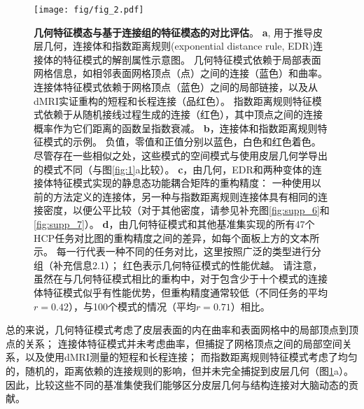 \documentclass[lang=cn,a4paper,newtx]{elegantpaper}
\begin{document}
\begin{figure}[!htb]
	\centering
	\texttt{[image: fig/fig\_2.pdf]}
	\caption{\textbf{几何特征模态与基于连接组的特征模态的对比评估}。
		\textbf{a}, 用于推导皮层几何，连接体和指数距离规则(exponential distance rule, EDR)连接体的特征模式的解剖属性示意图。
		几何特征模式依赖于局部表面网格信息，如相邻表面网格顶点（点）之间的连接（蓝色）和曲率。
		连接体特征模式依赖于网格顶点（蓝色）之间的局部链接，以及从dMRI实证重构的短程和长程连接（品红色）。
		指数距离规则特征模式依赖于从随机接线过程生成的连接（红色），其中顶点之间的连接概率作为它们距离的函数呈指数衰减。
		\textbf{b}，连接体和指数距离规则特征模式的示例。
		负值，零值和正值分别以蓝色，白色和红色着色。
		尽管存在一些相似之处，这些模式的空间模式与使用皮层几何学导出的模式不同（与图\ref{fig:1}a比较）。
		\textbf{c}，由几何，EDR和两种变体的连接体特征模式实现的静息态功能耦合矩阵的重构精度：
		一种使用以前的方法\cite{naze2021robustness}定义的连接体，另一种与指数距离规则连接体具有相同的连接密度，以便公平比较（对于其他密度，请参见补充图\ref{fig:supp_6}和\ref{fig:supp_7}）。
		\textbf{d}，由几何特征模式和其他基准集实现的所有47个HCP任务对比图的重构精度之间的差异，如每个面板上方的文本所示。
		每一行代表一种不同的任务对比，这里按照广泛的类型进行分组（补充信息2.1）；
		红色表示几何特征模式的性能优越。
		请注意，虽然在与几何特征模式相比的重构中，对于包含少于十个模式的连接体特征模式似乎有性能优势，但重构精度通常较低（不同任务的平均$ r = 0.42 $），与100个模式的情况（平均$ r = 0.71 $）相比。
	} \label{fig:2}
\end{figure}


总的来说，几何特征模式考虑了皮层表面的内在曲率和表面网格中的局部顶点到顶点的关系；
连接体特征模式并未考虑曲率，但捕捉了网格顶点之间的局部空间关系，以及使用dMRI测量的短程和长程连接；
而指数距离规则特征模式考虑了均匀的，随机的，距离依赖的连接规则的影响，但并未完全捕捉到皮层几何（图\ref{fig:2}a）。
因此，比较这些不同的基准集使我们能够区分皮层几何与结构连接对大脑动态的贡献。
\end{document}
